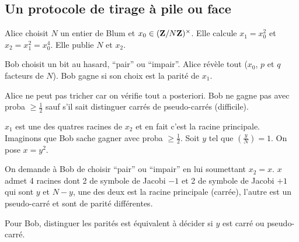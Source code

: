 \subsection{Un protocole de tirage à pile ou face}

	Alice choisit $N$ un entier de Blum et $x_0 \in (\mathbf{Z} / N\mathbf{Z})^\times$.
	Elle calcule $x_1 = x_0^2$ et $x_2 = x_1^2 = x_0^4$.
	Elle publie $N$ et $x_2$.
	
	Bob choisit un bit au hasard, “pair” ou “impair”.
	Alice révèle tout ($x_0$, $p$ et $q$ facteurs de $N$).
	Bob gagne si son choix est la parité de $x_1$.
	
	Alice ne peut pas tricher car on vérifie tout a posteriori.
	Bob ne gagne pas avec proba $\geq \frac{1}{2}$ sauf s'il sait distinguer carrés de pseudo-carrés (difficile).
	
	$x_1$ est une des quatres racines de $x_2$ et en fait c'est la racine principale.
	Imaginons que Bob sache gagner avec proba $\geq \frac{1}{2}$.
	Soit $y$ tel que $\left( \frac{y}{N} \right) = 1$.
	On pose $x = y^2$.
	
	On demande à Bob de choisir “pair” ou “impair” en lui soumettant $x_2 = x$.
	$x$ admet 4 racines dont 2 de symbole de Jacobi $-1$ et 2 de symbole de Jacobi $+1$ qui sont $y$ et $N - y$, une des deux est la racine principale (carrée), l'autre est un pseudo-carré et sont de parité différentes.
	
	Pour Bob, distinguer les parités est équivalent à décider si $y$ est carré ou pseudo-carré.